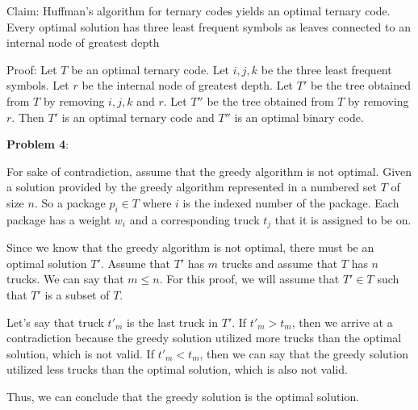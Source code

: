 \documentclass{article} %
\newcommand{\question}[2][]{\begin{flushleft}
        \textbf{Problem #1}: \textit{#2}

\end{flushleft}}
\begin{document}
    Claim: Huffman's algorithm for ternary codes yields an optimal ternary code. Every optimal solution has three least frequent symbols as leaves connected to an internal node of greatest depth

    Proof: Let $T$ be an optimal ternary code. Let $i, j, k$ be the three least frequent symbols. Let $r$ be the internal node of greatest depth. Let $T'$ be the tree obtained from $T$ by removing $i, j, k$ and $r$. Let $T''$ be the tree obtained from $T$ by removing $r$. Then $T'$ is an optimal ternary code and $T''$ is an optimal binary code.

    \newpage

    \question[4]{}

    For sake of contradiction, assume that the greedy algorithm is not optimal. Given a solution provided by the greedy algorithm represented in a numbered set $T$ of size $n$. So a package $p_i \in T$ where $i$ is the indexed number of the package. Each package has a weight $w_i$ and a corresponding truck $t_j$ that it is assigned to be on. 
    
    Since we know that the greedy algorithm is not optimal, there must be an optimal solution $T'$. Assume that $T'$ has $m$ trucks and assume that $T$ has $n$ trucks. We can say that $m \leq n$. For this proof, we will assume that $T' \in T$ such that $T'$ is a subset of $T$. 

    Let's say that truck $t'_m$ is the last truck in $T'$. If $t'_m > t_m$, then we arrive at a contradiction because the greedy solution utilized more trucks than the optimal solution, which is not valid. If $t'_m < t_m$, then we can say that the greedy solution utilized less trucks than the optimal solution, which is also not valid. 
    
    Thus, we can conclude that the greedy solution is the optimal solution.
\end{document}
